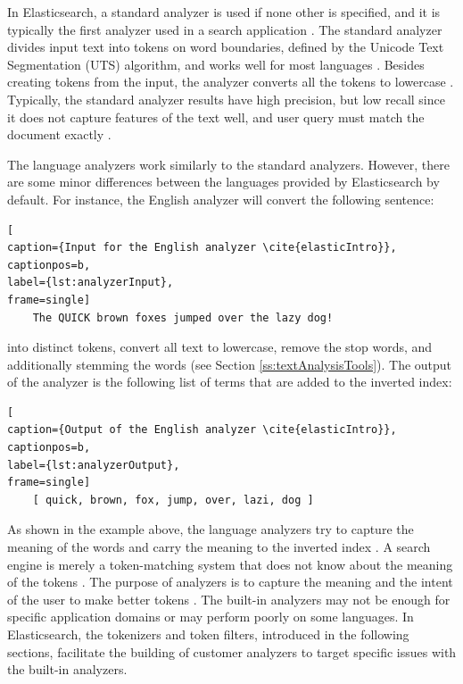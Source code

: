 In Elasticsearch, a standard analyzer is used if none other is specified, and 
it is typically the first analyzer used in a search application \cite{elasticIntro, relevantSearch}.
The standard analyzer divides input text into tokens on word boundaries, defined
by the Unicode Text Segmentation (UTS) algorithm, and works well for most languages \cite{elasticIntro}.
Besides creating tokens from the input, the analyzer converts all the tokens to lowercase \cite{elasticIntro}.
Typically, the standard analyzer results have high precision, but low recall
since it does not capture features of the text well, and user query must match the document exactly
\cite{relevantSearch}.


The language analyzers work similarly to the standard analyzers. 
However, there are some minor differences between the languages 
provided by Elasticsearch by default.
For instance, the English analyzer will convert the following sentence:
\begin{lstlisting}[
caption={Input for the English analyzer \cite{elasticIntro}},
captionpos=b,
label={lst:analyzerInput},
frame=single]
    The QUICK brown foxes jumped over the lazy dog!
\end{lstlisting}
into distinct tokens, convert all text to lowercase, remove the stop words, and
additionally stemming the words (see Section \ref{ss:textAnalysisTools}).
The output of the analyzer is the following list of terms that are added to the inverted index:
\cite{elasticIntro}
\begin{lstlisting}[
caption={Output of the English analyzer \cite{elasticIntro}},
captionpos=b,
label={lst:analyzerOutput},
frame=single]
    [ quick, brown, fox, jump, over, lazi, dog ]
\end{lstlisting}


As shown in the example above, the language analyzers try to capture the meaning of the words and 
carry the meaning to the inverted index \cite{relevantSearch}.
A search engine is merely a token-matching system that does not know 
about the meaning of the tokens \cite{relevantSearch}.
The purpose of analyzers is to capture the meaning and the intent of the user to make better tokens 
\cite{relevantSearch}.
The built-in analyzers may not be enough for specific application domains
or may perform poorly on some languages.
In Elasticsearch, the tokenizers and token filters, introduced in the following sections, 
facilitate the building of customer analyzers to target specific issues with the built-in analyzers.


